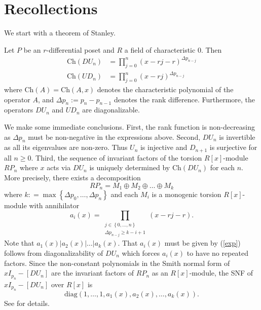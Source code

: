 \documentclass[ALCO, Unicode]{cedram}
\newcommand{\diag}{\mathrm{diag}}
\newcommand{\Ch}{\mathrm{Ch}}
\begin{document}
\section{Recollections}   
\label{recoll}    

We start with a theorem of Stanley. 
\begin{theorem} \cite[\S 4]{Stanley88}    \label{Stanley}         Let $P$ be  an  $r$-differential poset and $ R $ a field of characteristic $ 0 $. Then
\[
\begin{aligned}
\Ch(DU_{n}) &=\prod_{j=0}^n (x - r j - r  )^{\Delta p_{n-j}} \\
\Ch(UD_n) &=\prod_{j=0}^n (x - r j  )^{\Delta p_{n-j}}
\end{aligned}
\]
where $ \Ch(A) = \Ch(A,x) $ denotes the characteristic polynomial of the operator $ A$, and $ \Delta p_n:=p_n - p_{n-1} $ denotes the rank difference.  Furthermore, the operators $ DU_{n} $ and $ UD_{n} $ are diagonalizable.                                                                                   
\end{theorem}


We make some immediate conclusions. First, the rank function is non-decreasing as $ \Delta   p_{n} $ must be non-negative in the expressions above. Second, $ DU_{n} $ is invertible as all its eigenvalues are non-zero.  Thus $ U_{n} $ is injective and $ D_{n+1} $ is surjective for all $ n \geq 0 $.   Third, the  sequence of  invariant factors of the torsion  $ R[x] $-module $ RP_{n} $ where $ x $ acts via $ DU_{n} $ is uniquely determined by $  \Ch (DU_{n}) $ for each $n$.  More precisely, there exists a decomposition  $$ RP_{n} =  M_{1} \oplus M_{2} \oplus  \ldots \oplus  M_{k} $$ where $  k  : =  \max           \left \{    \Delta p_{0}, \ldots, \Delta p_{n} \right \}   $  and each $ M_{i} $ is a monogenic  torsion $R[x] $-module with annihilator  \begin{equation} 
\label{exp}  a_{i}(x)  =   \prod _{       \substack{ j \in \left  \{  0 , \ldots, n \right \}    \\ \Delta p_{n-j}  \geq k - i   +  1 }  }  ( x - rj- r)      .     
\end{equation}  Note that $  a_{1} (x) | a_{2}(x) | \ldots  |  a_{k  } ( x)    $. That $ a_{i}(x) $ must be given by (\ref{exp})     follows from diagonalizability of $ DU_{n} $ which forces $ a_{i}(x) $ to have no repeated  factors.   Since the non-constant polynomials in the Smith normal form of  $ xI_{p_{n}} -   [DU_{n}]  %
$  are the invariant factors of $ R P_{n}   $ as an $R[x]$-module, the SNF of $ xI_{p_{n}} - [DU_{n}]    $     over $ R[x] $ is  $$ \diag( 1, \ldots, 1, a_{1}(x) , a_{2}(x), \ldots, a_{k}(x) ) . $$          
%
See \cite[\S 8.2]{Miller} for  details.    
\end{document}
